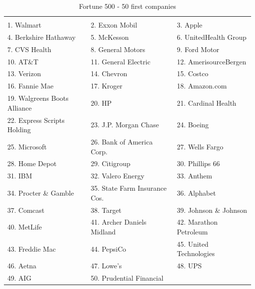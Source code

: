 \documentclass{article}
\begin{document}
\begin{table}[H]
\centering
\caption{Fortune 500 - 50 first companies}
\begin{tabular}{lll}
\hline
 \\ 1. Walmart 
&  2. Exxon Mobil 
&  3. Apple 
\\ 4. Berkshire Hathaway 
&  5. McKesson 
&  6. UnitedHealth Group 
\\ 7. CVS Health 
&  8. General Motors 
&  9. Ford Motor 
\\ 10. AT\&T 
&  11. General Electric 
&  12. AmerisourceBergen 
\\ 13. Verizon 
&  14. Chevron 
&  15. Costco 
\\ 16. Fannie Mae 
&  17. Kroger 
&  18. Amazon.com 
\\ 19. Walgreens Boots Alliance 
&  20. HP 
&  21. Cardinal Health 
\\ 22. Express Scripts Holding 
&  23. J.P. Morgan Chase 
&  24. Boeing 
\\ 25. Microsoft 
&  26. Bank of America Corp. 
&  27. Wells Fargo 
\\ 28. Home Depot 
&  29. Citigroup 
&  30. Phillips 66 
\\ 31. IBM 
&  32. Valero Energy 
&  33. Anthem 
\\ 34. Procter \& Gamble 
&  35. State Farm Insurance Cos. 
&  36. Alphabet 
\\ 37. Comcast 
&  38. Target 
&  39. Johnson \& Johnson 
\\ 40. MetLife 
&  41. Archer Daniels Midland 
&  42. Marathon Petroleum 
\\ 43. Freddie Mac 
&  44. PepsiCo 
&  45. United Technologies 
\\ 46. Aetna 
&  47. Lowe's 
&  48. UPS 
\\ 49. AIG 
&  50. Prudential Financial 
&
 \\ \hline

\end{tabular}
\end{table}
\end{document}
